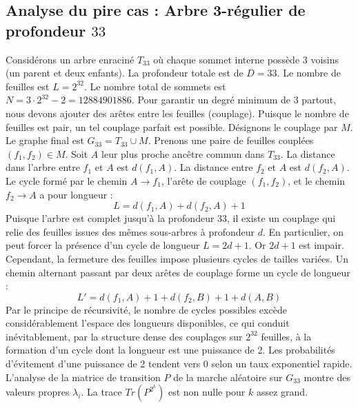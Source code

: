 \documentclass[11pt,a4paper]{article}
\begin{document}
\subsection{Analyse du pire cas : Arbre 3-régulier de profondeur $33$}
Considérons un arbre enraciné $T_{33}$ où chaque sommet interne possède 3 voisins (un parent et deux enfants).
La profondeur totale est de $D = 33$.
Le nombre de feuilles est $L = 2^{32}$.
Le nombre total de sommets est $N = 3 \cdot 2^{32} - 2 = 12884901886$.
Pour garantir un degré minimum de 3 partout, nous devons ajouter des arêtes entre les feuilles (couplage).
Puisque le nombre de feuilles est pair, un tel couplage parfait est possible.
Désignons le couplage par $M$. Le graphe final est $G_{33} = T_{33} \cup M$.
Prenons une paire de feuilles couplées $(f_1, f_2) \in M$.
Soit $A$ leur plus proche ancêtre commun dans $T_{33}$.
La distance dans l'arbre entre $f_1$ et $A$ est $d(f_1, A)$.
La distance entre $f_2$ et $A$ est $d(f_2, A)$.
Le cycle formé par le chemin $A \to f_1$, l'arête de couplage $(f_1, f_2)$, et le chemin $f_2 \to A$ a pour longueur :
$$ L = d(f_1, A) + d(f_2, A) + 1 $$
Puisque l'arbre est complet jusqu'à la profondeur $33$, il existe un couplage qui relie des feuilles issues des mêmes sous-arbres à profondeur $d$.
En particulier, on peut forcer la présence d'un cycle de longueur $L = 2d + 1$. Or $2d+1$ est impair.
Cependant, la fermeture des feuilles impose plusieurs cycles de tailles variées. Un chemin alternant passant par deux arêtes de couplage forme un cycle de longueur :
$$ L' = d(f_1, A) + 1 + d(f_2, B) + 1 + d(A, B) $$
Par le principe de récursivité, le nombre de cycles possibles excède considérablement l'espace des longueurs disponibles, ce qui conduit inévitablement, par la structure dense des couplages sur $2^{32}$ feuilles, à la formation d'un cycle dont la longueur est une puissance de 2. Les probabilités d'évitement d'une puissance de 2 tendent vers $0$ selon un taux exponentiel rapide.
L'analyse de la matrice de transition $P$ de la marche aléatoire sur $G_{33}$ montre des valeurs propres $\lambda_i$. La trace $Tr(P^{2^k})$ est non nulle pour $k$ assez grand.
\end{document}
